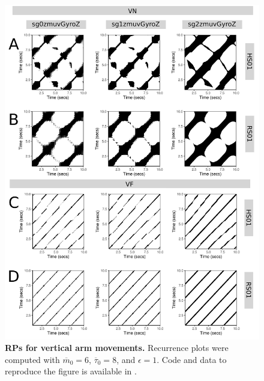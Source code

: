 \documentclass[fleqn,10pt]{wlscirep}
\begin{document}
\begin{figure}[ht]
\centering
\includegraphics[width=1.0\textwidth]{rp_aV}
\caption{
	{\bf RPs for vertical arm movements.}	
	Recurrence plots were computed with 
	$\overline{m}_0=6$, $\overline{\tau}_0=8$, and $\epsilon=1$.
	Code and data to reproduce the figure is available in \cite{srep2020}.
        }
    \label{fig:rp_aV}
\end{figure}
\end{document}
